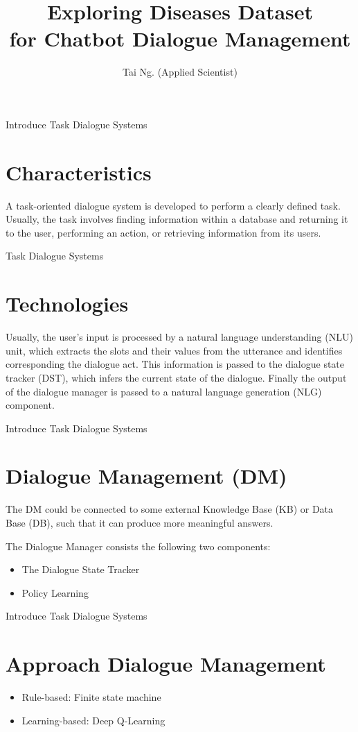 \documentclass[10pt]{beamer}
\title{Exploring Diseases Dataset \\for Chatbot Dialogue Management}
\author{Tai Ng. (Applied Scientist)}
\institute{VINBRAIN INTERNSHIP PROGRAM 2021 }
\begin{document}
\maketitle

\begin{frame}{Introduce Task Dialogue Systems}
\section{Characteristics}
A task-oriented dialogue system is developed to perform a clearly defined task. Usually, the task involves finding information within a database and returning it to the user, performing an action, or retrieving information from its users.
\end{frame}

\begin{frame}{Task Dialogue Systems}
\section{Technologies}
Usually, the user’s input is processed by a natural language understanding (NLU) unit, which extracts the slots and their values from the utterance and identifies corresponding the dialogue act. This information is passed to the dialogue state tracker (DST), which infers the current state of the dialogue. Finally the output of the dialogue manager is passed to a natural language generation (NLG) component.
\end{frame}

\begin{frame}{Introduce Task Dialogue Systems}
\section{Dialogue Management (DM)}

The DM could be connected to some external Knowledge Base (KB) or Data Base (DB), such that it can produce more meaningful answers.

The Dialogue Manager consists the following two components: 
\begin{itemize}
\item The Dialogue State Tracker 
\item Policy Learning
\end{itemize}
\end{frame}

\begin{frame}{Introduce Task Dialogue Systems}
\section{Approach Dialogue Management}
\begin{itemize}
\item Rule-based: Finite state machine 
\item Learning-based: Deep Q-Learning
\end{itemize}
\end{frame}
\end{document}
